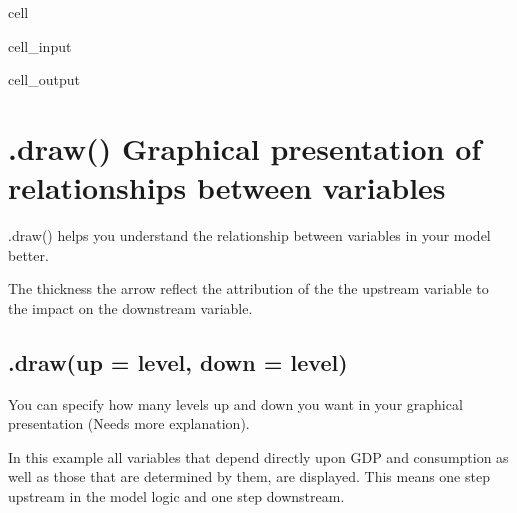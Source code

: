 \documentclass[letterpaper,10pt,english]{jupyterBook}
\begin{document}
\begin{sphinxuseclass}{cell}\begin{sphinxVerbatimInput}

\begin{sphinxuseclass}{cell_input}
\begin{sphinxVerbatim}[commandchars=\\\{\}]
\PYG{p}{[}\PYG{p}{]} 
\end{sphinxVerbatim}

\end{sphinxuseclass}\end{sphinxVerbatimInput}
\begin{sphinxVerbatimOutput}

\begin{sphinxuseclass}{cell_output}
\noindent{}

\end{sphinxuseclass}\end{sphinxVerbatimOutput}

\end{sphinxuseclass}

\section{.draw() Graphical presentation of relationships between variables}
\label{\detokenize{content/notebooks/modelflow_features:draw-graphical-presentation-of-relationships-between-variables}}
\sphinxAtStartPar
.draw() helps you understand the relationship between variables in your model better.

\sphinxAtStartPar
The thickness the arrow reflect the attribution of the the upstream variable to the impact on the downstream variable.


\subsection{.draw(up = level, down = level)}
\label{\detokenize{content/notebooks/modelflow_features:draw-up-level-down-level}}
\sphinxAtStartPar
You can specify how many levels up and down you want in your graphical presentation (Needs more explanation).

\sphinxAtStartPar
In this example all variables that depend directly upon GDP and consumption as well as those that are determined by them, are displayed. This means one step upstream in the model logic and one step downstream.
\end{document}
